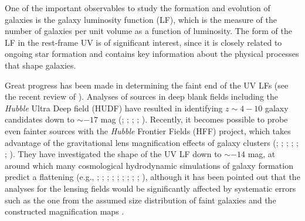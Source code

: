 \documentclass[]{pasj01}
\begin{document}
One of the important observables to study the formation and evolution of galaxies 
is the galaxy luminosity function (LF), 
which is the measure of the number of galaxies per unit volume as a function of luminosity. 
The form of the LF in the rest-frame UV is of significant interest,  
since it is closely related to ongoing star formation 
and contains key information about the physical processes that shape galaxies. 



Great progress has been made in determining the faint end of the UV LFs 
(see the recent review of \cite{2016ARA&A..54..761S}). 
Analyses of sources in deep blank fields including the \textit{Hubble} Ultra Deep field (HUDF) 
have resulted in identifying $z \sim 4-10$ galaxy candidates 
down to $\sim -17$ mag 
(\cite{2013ApJ...763L...7E}; \cite{2013ApJ...768..196S}; \cite{2013MNRAS.432.2696M}; 
\cite{2015ApJ...803...34B}; \cite{2015ApJ...810...71F}). 
Recently,  
it becomes possible to probe even fainter sources 
with the \textit{Hubble} Frontier Fields (HFF) project, 
which takes advantage of 
the gravitational lens magnification effects of galaxy clusters 
(\cite{2015ApJ...799...12I}; \cite{2015ApJ...814...69A}; \cite{2016ApJ...819..114K}; 
\cite{2016ApJ...823L..40C}; \cite{2016MNRAS.459.3812M}; \cite{2017ApJ...835..113L}; 
\cite{2017arXiv170204867I}). 
They have investigated the shape of the UV LF down to $\sim -14$ mag, 
at around which 
many cosmological hydrodynamic simulations of galaxy formation 
predict a flattening 
(e.g., 
\cite{2011ApJ...729...99M}; \cite{2012ApJ...753...16K}; \cite{2013ApJ...776...34K}; \cite{2013ApJ...766...94J}; \cite{2014MNRAS.442.2560W}; 
\cite{2015ApJ...807L..12O}; \cite{2016MNRAS.462..235L}; \cite{2016ApJ...825L..17G}; \cite{2016MNRAS.463.1462O}; \cite{2017MNRAS.464.1633F}),  
although 
it has been pointed out that 
the analyses for the lensing fields 
would be significantly affected by systematic errors 
such as the one from 
the assumed size distribution of faint galaxies \citep{2017ApJ...843...41B}  
and the constructed magnification maps \citep{2017ApJ...843..129B}.  
\end{document}
